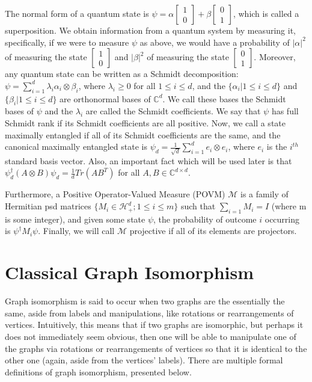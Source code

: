 \documentclass[12pt]{article}
\begin{document}
The normal form of a quantum state is $\psi = \alpha \begin{bmatrix}
1 \\
0 
\end{bmatrix}
+ \beta
\begin{bmatrix}
0 \\
1
\end{bmatrix}
$, which is called a superposition. We obtain information from a quantum system by measuring it, specifically, if we were to measure $\psi$ as above, we would have a probability of $|\alpha|^2$ of measuring the state $\begin{bmatrix}
1 \\
0 
\end{bmatrix}$ and $|\beta|^2$ of measuring the state $\begin{bmatrix}
0 \\
1 
\end{bmatrix}$. Moreover, any quantum state can be written as a Schmidt decomposition: $\psi = \sum_{i=1}^d \lambda_i \alpha_i \otimes \beta_i$, where $\lambda_i \geq 0$ for all $1 \leq i \leq d$, and the $\{\alpha_i| 1 \leq i \leq d\}$ and $\{\beta_i| 1 \leq i \leq d\}$ are orthonormal bases of $\mathbb{C}^d$. We call these bases the Schmidt bases of $\psi$ and the $\lambda_i$ are called the Schmidt coefficients. We say that $\psi$ has full Schmidt rank if its Schmidt coefficients are all positive. Now, we call a state maximally entangled if all of its Schmidt coefficients are the same, and the canonical maximally entangled state is $\psi_d = \frac{1}{\sqrt{d}} \sum_{i=1}^d e_i \otimes e_i$, where $e_i$ is the $i^{th}$ standard basis vector. Also, an important fact which will be used later is that $\psi^{\dag}_d (A \otimes B) \psi_d = \frac{1}{d} Tr(AB^T)$ for all $A, B \in \mathbb{C}^{d \times d}$.

Furthermore, a Positive Operator-Valued Measure (POVM) $\mathcal{M}$ is a family of Hermitian psd matrices $\{ M_i \in \mathcal{H}^d_+; 1 \leq i \leq m \}$ such that $\sum_{i=1}M_i = I$ (where m is some integer), and given some state $\psi$, the probability of outcome $i$ occurring is $\psi^\dag M_i \psi$. Finally, we will call $\mathcal{M}$ projective if all of its elements are projectors.


\section{Classical Graph Isomorphism} \label{classical}
Graph isomorphism is said to occur when two graphs are the essentially the same, aside from labels and manipulations, like rotations or rearrangements of vertices. Intuitively, this means that if two graphs are isomorphic, but perhaps it does not immediately seem obvious, then one will be able to manipulate one of the graphs via rotations or rearrangements of vertices so that it is identical to the other one (again, aside from the vertices' labels). There are multiple formal definitions of graph isomorphism, presented below.
\end{document}
